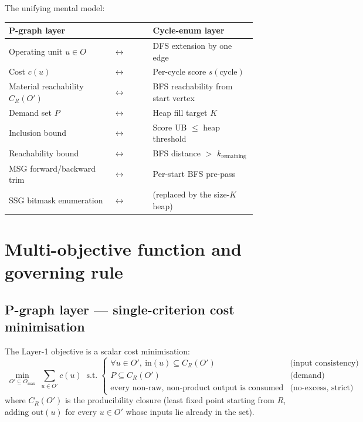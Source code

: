 \documentclass[11pt,a4paper]{article}
\begin{document}
The unifying mental model:

\begin{center}\small
\begin{tabular}{p{0.42\linewidth}l p{0.42\linewidth}}
\toprule
P-graph layer & & Cycle-enum layer \\
\midrule
Operating unit $u \in O$           &  $\leftrightarrow$ &  DFS extension by one edge \\
Cost $c(u)$                        &  $\leftrightarrow$ &  Per-cycle score $s(\text{cycle})$ \\
Material reachability $C_R(O')$    &  $\leftrightarrow$ &  BFS reachability from start vertex \\
Demand set $P$                     &  $\leftrightarrow$ &  Heap fill target $K$ \\
Inclusion bound                    &  $\leftrightarrow$ &  Score UB $\leq$ heap threshold \\
Reachability bound                 &  $\leftrightarrow$ &  BFS distance $>$ $k_{\text{remaining}}$ \\
MSG forward/backward trim          &  $\leftrightarrow$ &  Per-start BFS pre-pass \\
SSG bitmask enumeration            &  $\leftrightarrow$ &  (replaced by the size-$K$ heap) \\
\bottomrule
\end{tabular}
\end{center}

\section{Multi-objective function and governing rule}

\subsection{P-graph layer --- single-criterion cost minimisation}

The Layer-1 objective is a scalar cost minimisation:
\[
\boxed{\;
\min_{O' \subseteq O_{\max}}\; \sum_{u \in O'} c(u)\;
\;\text{s.t.}\;
\begin{cases}
\forall u \in O',\ \mathrm{in}(u) \subseteq C_R(O') & \text{(input consistency)}\\
P \subseteq C_R(O') & \text{(demand)}\\
\text{every non-raw, non-product output is consumed} & \text{(no-excess, strict)}
\end{cases}\;}
\]
where $C_R(O')$ is the producibility closure (least fixed point starting
from $R$, adding $\mathrm{out}(u)$ for every $u \in O'$ whose inputs lie
already in the set).
\end{document}
